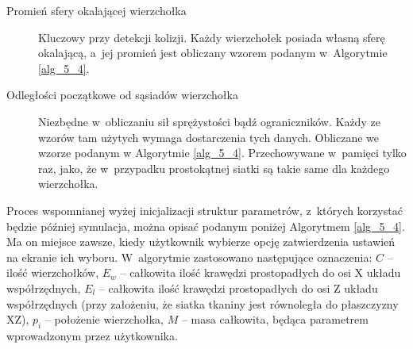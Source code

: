 \begin{description}
			\item[Promień sfery okalającej wierzchołka] Kluczowy przy detekcji kolizji. Każdy wierzchołek posiada własną sferę okalającą, a~jej promień jest obliczany wzorem podanym w~Algorytmie \ref{alg_5_4}.
			
			\item[Odległości początkowe od sąsiadów wierzchołka] Niezbędne w~obliczaniu sił sprężystości bądź ograniczników. Każdy ze wzorów tam użytych wymaga dostarczenia tych danych. Obliczane we wzorze podanym w Algorytmie \ref{alg_5_4}. Przechowywane w~pamięci tylko raz, jako, że w~przypadku prostokątnej siatki są takie same dla każdego wierzchołka.
			
		\end{description}
		
		Proces wspomnianej wyżej inicjalizacji struktur parametrów, z~których korzystać będzie później symulacja, można opisać podanym poniżej Algorytmem \ref{alg_5_4}. Ma on miejsce zawsze, kiedy użytkownik wybierze opcję zatwierdzenia ustawień na ekranie ich wyboru. W~algorytmie zastosowano następujące oznaczenia: \(C\) -- ilość wierzchołków, \(E_{w}\) -- całkowita ilość krawędzi prostopadłych do osi X układu współrzędnych, \(E_{l}\) -- całkowita ilość krawędzi prostopadłych do osi Z układu współrzędnych (przy założeniu, że siatka tkaniny jest równoległa do płaszczyzny XZ), \(p_{i}\) -- położenie wierzchołka, \(M\) -- masa całkowita, będąca parametrem wprowadzonym przez użytkownika.
		
